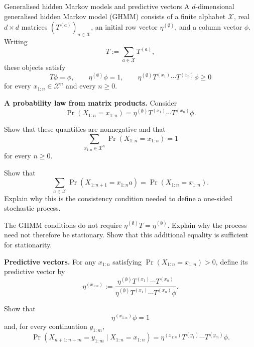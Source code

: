 \messThreeExercise

\begin{exercise}[Extension]{Generalised hidden Markov models and predictive vectors}
  A $d$-dimensional generalised hidden Markov model (GHMM) consists of a
  finite alphabet $\mathcal X$, real $d\times d$ matrices
  $(T^{(a)})_{a\in\mathcal X}$, an initial row vector
  $\eta^{(\emptyset)}$, and a column vector $\phi$. Writing
  \[
    T:=\sum_{a\in\mathcal X}T^{(a)},
  \]
  these objects satisfy
  \[
    T\phi=\phi,\qquad
    \eta^{(\emptyset)}\phi=1,\qquad
    \eta^{(\emptyset)}T^{(x_1)}\cdots T^{(x_n)}\phi\geq0
  \]
  for every $x_{1:n}\in\mathcal X^n$ and every $n\geq0$.

  \begin{parts}
    \item \textbf{A probability law from matrix products.}
      Consider
      \[
        \Pr(X_{1:n}=x_{1:n})
          =\eta^{(\emptyset)}
            T^{(x_1)}\cdots T^{(x_n)}\phi.
      \]
      \begin{subparts}
        \item Show that these quantities are nonnegative and that
          \[
            \sum_{x_{1:n}\in\mathcal X^n}
              \Pr(X_{1:n}=x_{1:n})=1
          \]
          for every $n\geq0$.

        \item Show that
          \[
            \sum_{a\in\mathcal X}
              \Pr(X_{1:n+1}=x_{1:n}a)
              =\Pr(X_{1:n}=x_{1:n}).
          \]
          Explain why this is the consistency condition needed to define a
          one-sided stochastic process.

        \item The GHMM conditions do not require
          $\eta^{(\emptyset)}T=\eta^{(\emptyset)}$. Explain why the process
          need not therefore be stationary. Show that this additional
          equality is sufficient for stationarity.
      \end{subparts}

    \item \textbf{Predictive vectors.}
      For any $x_{1:n}$ satisfying
      $\Pr(X_{1:n}=x_{1:n})>0$, define its predictive vector by
      \[
        \eta^{(x_{1:n})}
          :=\frac{\eta^{(\emptyset)}
              T^{(x_1)}\cdots T^{(x_n)}}
            {\eta^{(\emptyset)}
              T^{(x_1)}\cdots T^{(x_n)}\phi}.
      \]
      \begin{subparts}
        \item Show that
          \[
            \eta^{(x_{1:n})}\phi=1
          \]
          and, for every continuation $y_{1:m}$,
          \[
            \Pr(X_{n+1:n+m}=y_{1:m}\mid X_{1:n}=x_{1:n})
              =\eta^{(x_{1:n})}
                T^{(y_1)}\cdots T^{(y_m)}\phi.
          \]


\end{subparts}
\end{parts}
\end{exercise}
